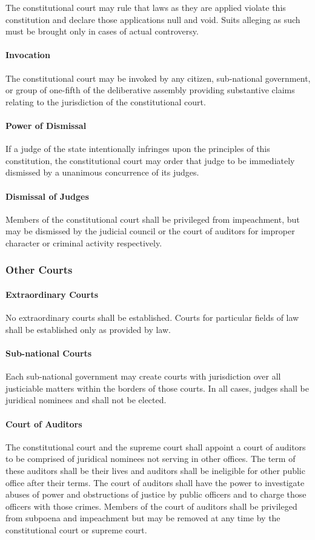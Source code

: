 \documentclass{article}
\begin{document}
The constitutional court may rule that laws as they are applied violate this constitution and declare those applications null and void. Suits alleging as such must be brought only in cases of actual controversy.
\paragraph{Invocation}
The constitutional court may be invoked by any citizen, sub-national government, or group of one-fifth of the deliberative assembly providing substantive claims relating to the jurisdiction of the constitutional court.
\paragraph{Power of Dismissal}
If a judge of the state intentionally infringes upon the principles of this constitution, the constitutional court may order that judge to be immediately dismissed by a unanimous concurrence of its judges.
\paragraph{Dismissal of Judges}
Members of the constitutional court shall be privileged from impeachment, but may be dismissed by the judicial council or the court of auditors for improper character or criminal activity respectively.
\subsubsection{Other Courts}
\paragraph{Extraordinary Courts}
No extraordinary courts shall be established. Courts for particular fields of law shall be established only as provided by law.
\paragraph{Sub-national Courts}
Each sub-national government may create courts with jurisdiction over all justiciable matters within the borders of those courts. In all cases, judges shall be juridical nominees and shall not be elected.
\paragraph{Court of Auditors}
The constitutional court and the supreme court shall appoint a court of auditors to be comprised of juridical nominees not serving in other offices. The term of these auditors shall be their lives and auditors shall be ineligible for other public office after their terms. The court of auditors shall have the power to investigate abuses of power and obstructions of justice by public officers and to charge those officers with those crimes. Members of the court of auditors shall be privileged from subpoena and impeachment but may be removed at any time by the constitutional court or supreme court.
\end{document}
